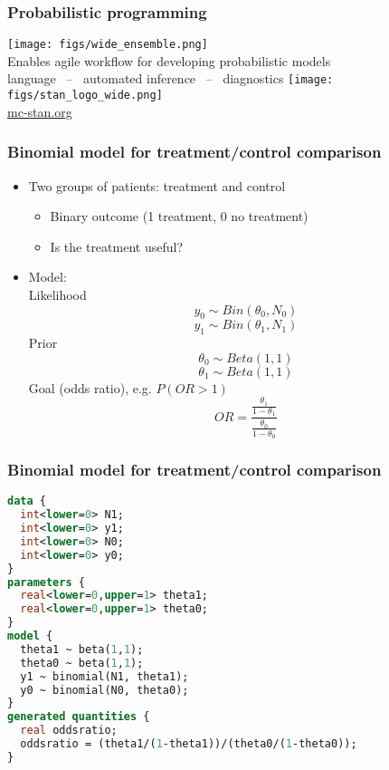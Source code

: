 \documentclass[10pt]{beamer}
\begin{document}
\begin{frame}

  \frametitle{Probabilistic programming}

  \begin{center}
   \vspace{-\baselineskip}
    \texttt{[image: figs/wide\_ensemble.png]}\\
   \vspace{2\baselineskip}
  {\large Enables agile workflow for developing probabilistic models}\\
   \vspace{\baselineskip}
   language \, -- \,
   automated inference \, -- \,
   diagnostics
   \vspace{\baselineskip}
  \vfill
    \texttt{[image: figs/stan\_logo\_wide.png]}\\
    \url{mc-stan.org}
  \end{center}

\end{frame}

\begin{frame}[fragile]
  \frametitle{Binomial model for treatment/control comparison}

  \begin{itemize}
  \item Two groups of patients: treatment and control
    \begin{itemize}
    \item Binary outcome (1 treatment, 0 no treatment)
    \item Is the treatment useful?
    \end{itemize}

    \item Model:\\
    Likelihood
    \[
    y_0 \sim Bin(\theta_0, N_0)
    \]
    \[
    y_1 \sim Bin(\theta_1, N_1)
    \]
    \pause
    Prior
    \[
    \theta_0 \sim Beta(1, 1)
    \]
    \[
    \theta_1 \sim Beta(1, 1)
    \]
    \pause
    Goal (odds ratio), e.g. $P(OR>1)$
    \[
    OR = \frac{\frac{\theta_1}{1-\theta_1}}{\frac{\theta_0}{1-\theta_0}}
    \]
  \end{itemize}

\end{frame}

\begin{frame}[fragile]
  \frametitle{Binomial model for treatment/control comparison}
  {\footnotesize
  \begin{lstlisting}[language=Stan]
data {
  int<lower=0> N1;
  int<lower=0> y1;
  int<lower=0> N0;
  int<lower=0> y0;
}
parameters {
  real<lower=0,upper=1> theta1;
  real<lower=0,upper=1> theta0;
}
model {
  theta1 ~ beta(1,1);
  theta0 ~ beta(1,1);
  y1 ~ binomial(N1, theta1);
  y0 ~ binomial(N0, theta0);
}
generated quantities {
  real oddsratio;
  oddsratio = (theta1/(1-theta1))/(theta0/(1-theta0));
}
  \end{lstlisting}
}
\end{frame}
\end{document}

